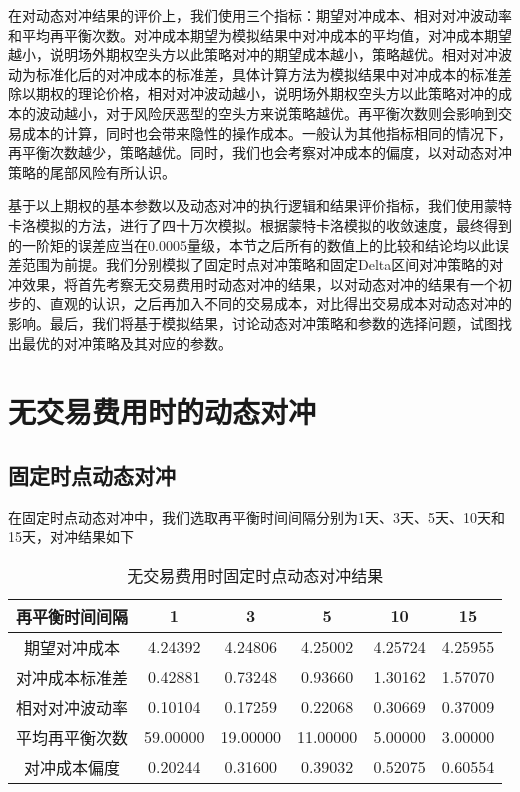 在对动态对冲结果的评价上，我们使用三个指标：期望对冲成本、相对对冲波动率和平均再平衡次数。对冲成本期望为模拟结果中对冲成本的平均值，对冲成本期望越小，说明场外期权空头方以此策略对冲的期望成本越小，策略越优。相对对冲波动为标准化后的对冲成本的标准差，具体计算方法为模拟结果中对冲成本的标准差除以期权的理论价格，相对对冲波动越小，说明场外期权空头方以此策略对冲的成本的波动越小，对于风险厌恶型的空头方来说策略越优。再平衡次数则会影响到交易成本的计算，同时也会带来隐性的操作成本。一般认为其他指标相同的情况下，再平衡次数越少，策略越优。同时，我们也会考察对冲成本的偏度，以对动态对冲策略的尾部风险有所认识。

基于以上期权的基本参数以及动态对冲的执行逻辑和结果评价指标，我们使用蒙特卡洛模拟的方法，进行了四十万次模拟。根据蒙特卡洛模拟的收敛速度，最终得到的一阶矩的误差应当在0.0005量级，本节之后所有的数值上的比较和结论均以此误差范围为前提。我们分别模拟了固定时点对冲策略和固定Delta区间对冲策略的对冲效果，将首先考察无交易费用时动态对冲的结果，以对动态对冲的结果有一个初步的、直观的认识，之后再加入不同的交易成本，对比得出交易成本对动态对冲的影响。最后，我们将基于模拟结果，讨论动态对冲策略和参数的选择问题，试图找出最优的对冲策略及其对应的参数。

\section{无交易费用时的动态对冲}

\subsection{固定时点动态对冲}

在固定时点动态对冲中，我们选取再平衡时间间隔分别为1天、3天、5天、10天和15天，对冲结果如下

\begin{table}[htbp]
  \centering
  \caption{无交易费用时固定时点动态对冲结果}
  \label{tab:fixed_time_0}
  \begin{tabular}{cccccc}
    \toprule
    再平衡时间间隔 & 1 & 3 & 5 & 10 & 15 \\
    \midrule
    期望对冲成本 & 4.24392 & 4.24806 & 4.25002 & 4.25724 & 4.25955 \\
    对冲成本标准差 & 0.42881 & 0.73248 & 0.93660 & 1.30162 & 1.57070 \\
    相对对冲波动率 & 0.10104 & 0.17259 & 0.22068 & 0.30669 & 0.37009 \\
    平均再平衡次数 & 59.00000 & 19.00000 & 11.00000 & 5.00000 & 3.00000 \\
    对冲成本偏度 & 0.20244 & 0.31600 & 0.39032 & 0.52075 & 0.60554 \\
    \bottomrule
  \end{tabular}
\end{table}

